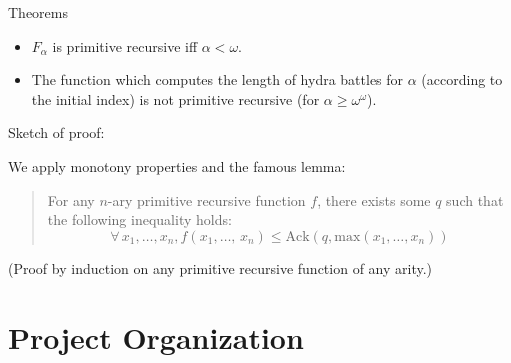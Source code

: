 \documentclass[10pt, fleqn]{beamer}
\begin{document}
\begin{frame}
  
  \begin{block}{Theorems}
    \begin{itemize}
    \item $F_\alpha$ is primitive recursive iff $\alpha<\omega$.
     \item  
    The function which computes the length of hydra battles
    for $\alpha$ (according to the initial index) is not primitive recursive
    (for $\alpha\geq \omega^\omega$).

    \end{itemize}
    
    
  
  \begin{block}{Sketch of proof:}

   We apply monotony properties and the famous lemma:
    \vspace{5pt}
    
       \begin{quote}
      {\color{mathcolor}
        For any $n$-ary primitive recursive  function $f$, 
        there exists some $q$ such that the following inequality holds:
         \[\forall\,x_1,\dots,x_n,  
          f(x_1,\dots,\,x_n)\leq\textrm{Ack}(q,\textrm{max}(x_1,\dots,x_n))\]}
    \end{quote}
    (Proof by induction on any primitive recursive function of any arity.)
  \end{block}
  
  \end{block}
\end{frame}




\begin{frame}
  \frametitle{}
  \begin{scriptsize}
  \end{scriptsize}
\end{frame}




\section{Project Organization}
\end{document}

